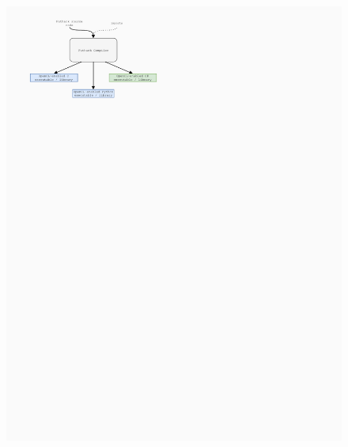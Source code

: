 \documentclass[10pt, compress, usenames, dvipsnames]{beamer}
\begin{document}
\begin{frame}[fragile]
\begin{figure}
\begin{overprint}
        \includegraphics{./images/futhark_diagram_after.pdf}

\end{overprint}
\end{figure}
\end{frame}
\end{document}
